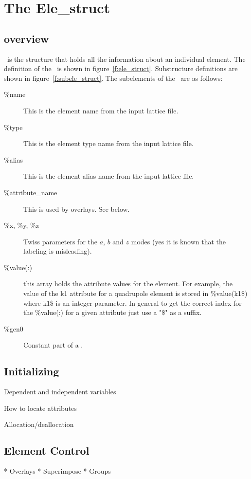 \chapter{The Ele\_struct}
\section{overview}

\elestruct\ is the structure that holds all the information about an
individual element. The definition of the \elestruct\ is shown in 
figure~\ref{f:ele_struct}. Substructure definitions are shown in 
figure~\ref{f:subele_struct}. The subelements of the \elestruct\ are as
follows:
\begin{description}
\item[\%name] This is the element name from the input lattice file.
\item[\%type] This is the element type name from the input lattice file.
\item[\%alias] This is the element alias name from the input lattice file.
\item[\%attribute\_name] This is used by overlays. See below.
\item[\%x, \%y, \%z] Twiss parameters for the $a$, $b$ and $z$ modes (yes it is 
known that the labeling is misleading).
\item[\%value(:)] this array holds the attribute values for the element. 
For example, the value of the  k1 attribute for a quadrupole element is stored
in \%value(k1\$) where k1\$ is an integer parameter. In general to get the correct
index for the \%value(:) for a given attribute just use a "\$" as a suffix.
\item[\%gen0] Constant part of a \genfield.
\end{description} 


\section{Initializing}

  Dependent and independent variables

  How to locate attributes

  Allocation/deallocation

\section{Element Control}

    * Overlays
    * Superimpose
    * Groups

